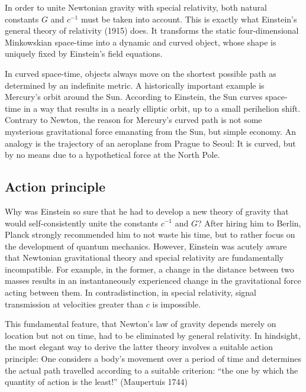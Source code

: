 \documentclass{scrartcl}
\begin{document}

\newpage {}
\label{sec:1100}

In order to unite Newtonian gravity with special relativity, both natural constants $G$ and $c^{−1}$ must be taken into account. This is exactly what Einstein's general theory of relativity (1915) does. It transforms the static four-dimensional Minkowskian space-time into a dynamic and curved object, whose shape is uniquely fixed by Einstein's field equations.

In curved space-time, objects always move on the shortest possible path as determined by an indefinite metric. A historically important example is Mercury's orbit around the Sun. According to Einstein, the Sun curves space-time in a way that results in a nearly elliptic orbit, up to a small perihelion shift. Contrary to Newton, the reason for Mercury's curved path is not some mysterious gravitational force emanating from the Sun, but simple economy. An analogy is the trajectory of an aeroplane from Prague to Seoul: It is curved, but by no means due to a hypothetical force at the North Pole.


\subsection*{Action principle}

Why was Einstein so sure that he had to develop a new theory of gravity that would self-consistently unite the constants $c^{−1}$ and $G$? After hiring him to Berlin, Planck strongly recommended him to not waste his time, but to rather focus on the development of quantum mechanics. However, Einstein was acutely aware that Newtonian gravitational theory and special relativity are fundamentally incompatible. For example, in the former, a change in the distance between two masses results in an instantaneously experienced change in the gravitational force acting between them. In contradistinction, in special relativity, signal transmission at velocities greater than $c$ is impossible.

This fundamental feature, that Newton's law of gravity depends merely on location but not on time, had to be eliminated by general relativity. In hindsight, the most elegant way to derive the latter theory involves a suitable action principle: One considers a body's movement over a period of time and determines the actual path travelled according to a suitable criterion: \enquote{the one by which the quantity of action is the least!} (Maupertuis 1744)
\end{document}
